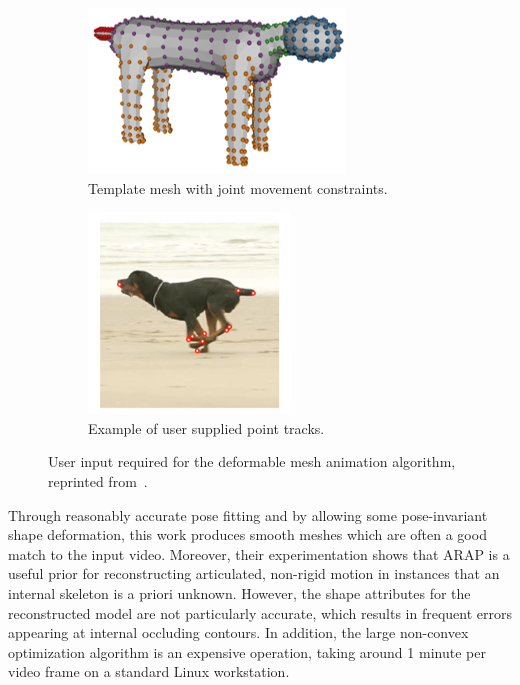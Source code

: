 \begin{figure}[H]
    \centering
    \begin{subfigure}{0.5\textwidth}
    \centering
        \includegraphics[height=0.5\linewidth]{arapsfm/arap_annotated_template}
        \caption{Template mesh with joint movement constraints.}
    \end{subfigure}%
    \begin{subfigure}{0.5\textwidth}
    \centering
        \includegraphics[height=0.5\linewidth]{arapsfm/arap_point_tracks}
        \caption{Example of user supplied point tracks.}
    \end{subfigure}%
    \caption{User input required for the deformable mesh animation algorithm, reprinted from~\cite{arap_stebbing}.}
    \label{fig:arap_user}
\end{figure} 

Through reasonably accurate pose fitting and by allowing some pose-invariant shape deformation, this work produces smooth meshes which are often a good match to the input video. Moreover, their experimentation shows that ARAP is a useful prior for reconstructing articulated, non-rigid motion in instances that an internal skeleton is a priori unknown. However, the shape attributes for the reconstructed model are not particularly accurate, which results in frequent errors appearing at internal occluding contours. In addition, the large non-convex optimization algorithm is an expensive operation, taking around 1 minute per video frame on a standard Linux workstation.

